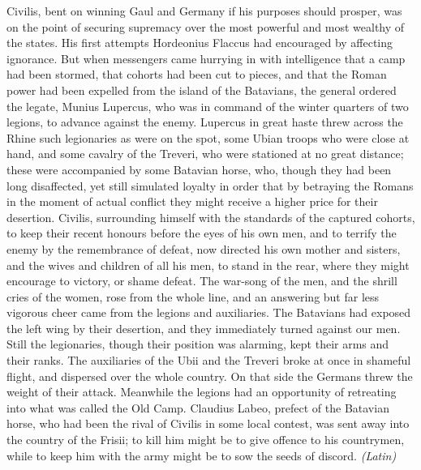 Civilis, bent on winning Gaul and Germany if his purposes should prosper, was on the point of securing supremacy over the most powerful and most wealthy of the states. His first attempts Hordeonius Flaccus had encouraged by affecting ignorance. But when messengers came hurrying in with intelligence that a camp had been stormed, that cohorts had been cut to pieces, and that the Roman power had been expelled from the island of the Batavians, the general ordered the legate, Munius Lupercus, who was in command of the winter quarters of two legions, to advance against the enemy. Lupercus in great haste threw across the Rhine such legionaries as were on the spot, some Ubian troops who were close at hand, and some cavalry of the Treveri, who were stationed at no great distance; these were accompanied by some Batavian horse, who, though they had been long disaffected, yet still simulated loyalty in order that by betraying the Romans in the moment of actual conflict they might receive a higher price for their desertion. Civilis, surrounding himself with the standards of the captured cohorts, to keep their recent honours before the eyes of his own men, and to terrify the enemy by the remembrance of defeat, now directed his own mother and sisters, and the wives and children of all his men, to stand in the rear, where they might encourage to victory, or shame defeat. The war-song of the men, and the shrill cries of the women, rose from the whole line, and an answering but far less vigorous cheer came from the legions and auxiliaries. The Batavians had exposed the left wing by their desertion, and they immediately turned against our men. Still the legionaries, though their position was alarming, kept their arms and their ranks. The auxiliaries of the Ubii and the Treveri broke at once in shameful flight, and dispersed over the whole country. On that side the Germans threw the weight of their attack. Meanwhile the legions had an opportunity of retreating into what was called the Old Camp. Claudius Labeo, prefect of the Batavian horse, who had been the rival of Civilis in some local contest, was sent away into the country of the Frisii; to kill him might be to give offence to his countrymen, while to keep him with the army might be to sow the seeds of discord. \emph{(Latin)}


